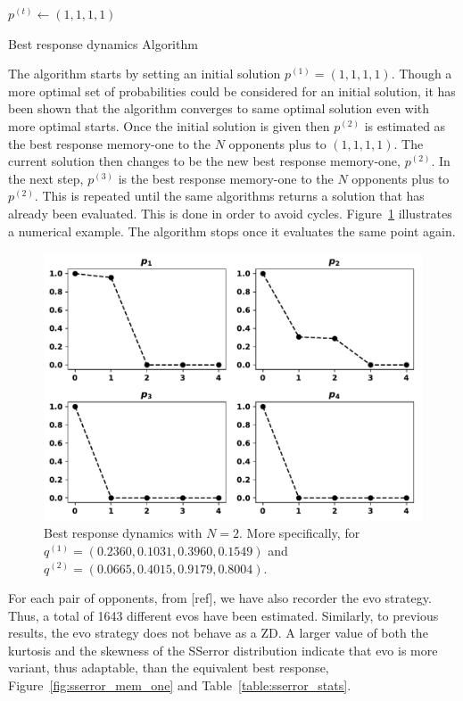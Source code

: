 \documentclass[10pt]{article}
\begin{document}
\begin{algorithm}[H]
    $p^{(t)}\leftarrow (1, 1, 1, 1)$\;
    \caption{Best response dynamics Algorithm}
    \label{algo:best_response_dynamics}
\end{algorithm}

The algorithm starts by setting an initial solution \(p^{(1)}=(1, 1, 1, 1)\).
Though a more optimal set of probabilities could be considered for an initial
solution, it has been shown that the algorithm converges to same optimal
solution even with more optimal starts. Once the initial solution is given then
\(p^{(2)}\) is estimated as the best response memory-one to the \(N\) opponents
plus to \((1, 1, 1, 1)\). The current solution then changes to be the new best
response memory-one, \(p^{(2)}\). In the next step, \(p^{(3)}\) is the best
response memory-one to the \(N\) opponents plus to \(p^{(2)}\). This is repeated
until the same algorithms returns a solution that has already been evaluated.
This is done in order to avoid cycles.
Figure~\ref{fig:best_response_dynamics_results} illustrates a numerical example.
The algorithm stops once it evaluates the same point again.

\begin{figure}[!htbp]
    \centering
    \includegraphics[width=.6\textwidth]{img/evolution_example_two.pdf}
    \caption{Best response dynamics with \(N=2\). More specifically, for
    \(q ^{(1)}=(0.2360,
                0.1031,
                0.3960,
                0.1549)\) and
    \(q ^{(2)}=(0.0665,
                0.4015,
                0.9179,
                0.8004)\).}
\label{fig:best_response_dynamics_results}
\end{figure}

For each pair of opponents, from [ref], we have also recorder the evo
strategy. Thus, a total of 1643 different evos have been estimated. Similarly,
to previous results, the evo strategy does not behave as a ZD. A larger value
of both the kurtosis and the skewness of the SSerror distribution indicate that
evo is more variant, thus adaptable, than the equivalent best response,
Figure~\ref{fig:sserror_mem_one} and Table~\ref{table:sserror_stats}.
\end{document}
